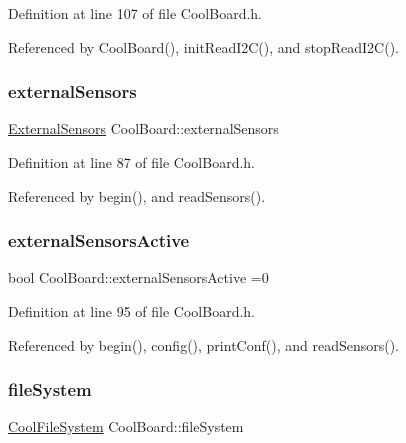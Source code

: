 Definition at line 107 of file Cool\+Board.\+h.



Referenced by Cool\+Board(), init\+Read\+I2\+C(), and stop\+Read\+I2\+C().

\mbox{\label{classCoolBoard_a09e26264839c65873eb56af476eff6b2}} 
\subsubsection{\texorpdfstring{external\+Sensors}{externalSensors}}
{\footnotesize\ttfamily \hyperlink{classExternalSensors}{External\+Sensors} Cool\+Board\+::external\+Sensors\hspace{0.3cm}{\ttfamily [private]}}



Definition at line 87 of file Cool\+Board.\+h.



Referenced by begin(), and read\+Sensors().

\mbox{\label{classCoolBoard_a638b00b76aeb819ecfd4c10b8cdd7bb7}} 
\subsubsection{\texorpdfstring{external\+Sensors\+Active}{externalSensorsActive}}
{\footnotesize\ttfamily bool Cool\+Board\+::external\+Sensors\+Active =0\hspace{0.3cm}{\ttfamily [private]}}



Definition at line 95 of file Cool\+Board.\+h.



Referenced by begin(), config(), print\+Conf(), and read\+Sensors().

\mbox{\label{classCoolBoard_a42c2586fbb13ff7f06538e9284e8538d}} 
\subsubsection{\texorpdfstring{file\+System}{fileSystem}}
{\footnotesize\ttfamily \hyperlink{classCoolFileSystem}{Cool\+File\+System} Cool\+Board\+::file\+System\hspace{0.3cm}{\ttfamily [private]}}



